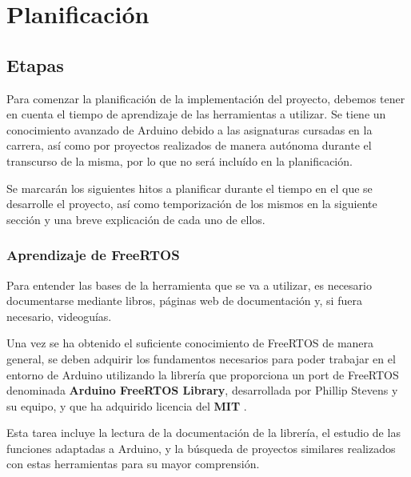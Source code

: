 \chapter{Planificación}


\noindent{}
\section{Etapas}

Para comenzar la planificación de la implementación del proyecto, debemos tener en cuenta el tiempo de aprendizaje de las herramientas a utilizar. Se tiene un conocimiento avanzado de Arduino debido a las asignaturas cursadas en la carrera, así como por proyectos realizados de manera autónoma durante el transcurso de la misma, por lo que no será incluído en la planificación. 

Se marcarán los siguientes hitos a planificar durante el tiempo en el que se desarrolle el proyecto, así como temporización de los mismos en la siguiente sección y una breve explicación de cada uno de ellos. 

\subsection{Aprendizaje de FreeRTOS}

Para entender las bases de la herramienta que se va a utilizar, es necesario documentarse mediante libros, páginas web de documentación y, si fuera necesario, videoguías.

 Una vez se ha obtenido el suficiente conocimiento de FreeRTOS de manera general, se deben adquirir los fundamentos necesarios para poder trabajar en el entorno de Arduino utilizando la librería que proporciona un port de FreeRTOS denominada \textbf{Arduino FreeRTOS Library}, desarrollada por Phillip Stevens y su equipo, y que ha adquirido licencia del \textbf{MIT} \cite{freertos_arduino}. 

Esta tarea incluye la lectura de la documentación de la librería, el estudio de las funciones adaptadas a Arduino, y la búsqueda de proyectos similares realizados con estas herramientas para su mayor comprensión.


